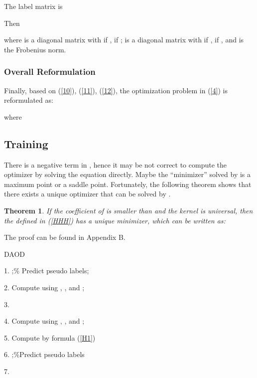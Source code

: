 \documentclass[journal]{IEEEtran}
\newtheorem{theorem}{\textbf{Theorem}}
\begin{document}
 The  label matrix  is
 

Then

where  is a  diagonal matrix with  if ,   if ;  is a  diagonal matrix with  if ,   if , and  is the Frobenius norm.


\subsubsection{Overall Reformulation}

Finally, based on (\ref{10}), (\ref{11}), (\ref{12}), the optimization problem in (\ref{4}) is reformulated as:

where 



\subsection{Training} 
There is a negative term in , hence it may be not correct to compute the optimizer by solving the equation  directly. Maybe the ``minimizer'' solved by  is a maximum point or a saddle point. Fortunately, the following {theorem} shows that there exists a unique optimizer that can be solved by .
\begin{theorem}\label{HH}
If the coefficient  of   is smaller than  and the kernel  is universal, then the  defined in (\ref{HHH}) has a unique minimizer, which can be written as:

\end{theorem}

The proof can be found in Appendix B.

 \begin{algorithm} [t]
     \caption{DAOD} 
      
       1. { };\% Predict pseudo labels;\
       
       2. Compute  using , , and ;
       
       3. \;
        
      
      
       
      \While{} 
        { 
        4. Compute  using , , and ;
      
        5. Compute  by formula (\ref{H1})\;
        
        6. ;\%Predict pseudo labels\;
    
        7. \;
       } 
\end{algorithm}
 
\end{document}
